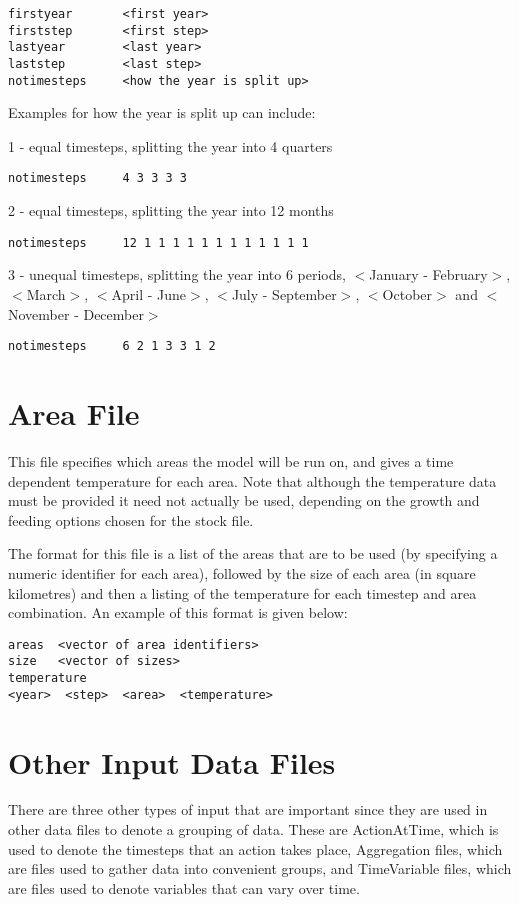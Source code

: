 \documentclass [a4paper, 10pt]{book}
\begin{document}
{\small\begin{verbatim}
firstyear       <first year>
firststep       <first step>
lastyear        <last year>
laststep        <last step>
notimesteps     <how the year is split up>
\end{verbatim}}

Examples for how the year is split up can include:\newline

1 - equal timesteps, splitting the year into 4 quarters
{\small\begin{verbatim}
notimesteps     4 3 3 3 3
\end{verbatim}}

2 - equal timesteps, splitting the year into 12 months
{\small\begin{verbatim}
notimesteps     12 1 1 1 1 1 1 1 1 1 1 1 1
\end{verbatim}}

3 - unequal timesteps, splitting the year into 6 periods, $<$January - February$>$, $<$March$>$, $<$April - June$>$, $<$July - September$>$, $<$October$>$ and $<$November - December$>$
{\small\begin{verbatim}
notimesteps     6 2 1 3 3 1 2
\end{verbatim}}

\section{Area File}\label{sec:areafile}
This file specifies which areas the model will be run on, and gives a time dependent temperature for each area.  Note that although the temperature data must be provided it need not actually be used, depending on the growth and feeding options chosen for the stock file.

\bigskip
The format for this file is a list of the areas that are to be used (by specifying a numeric identifier for each area), followed by the size of each area (in square kilometres) and then a listing of the temperature for each timestep and area combination.  An example of this format is given below:

{\small\begin{verbatim}
areas  <vector of area identifiers>
size   <vector of sizes>
temperature
<year>  <step>  <area>  <temperature>
\end{verbatim}}

\section{Other Input Data Files}\label{sec:otherinputfile}
There are three other types of input that are important since they are used in other data files to denote a grouping of data.  These are ActionAtTime, which is used to denote the timesteps that an action takes place, Aggregation files, which are files used to gather data into convenient groups, and TimeVariable files, which are files used to denote variables that can vary over time.
\end{document}
